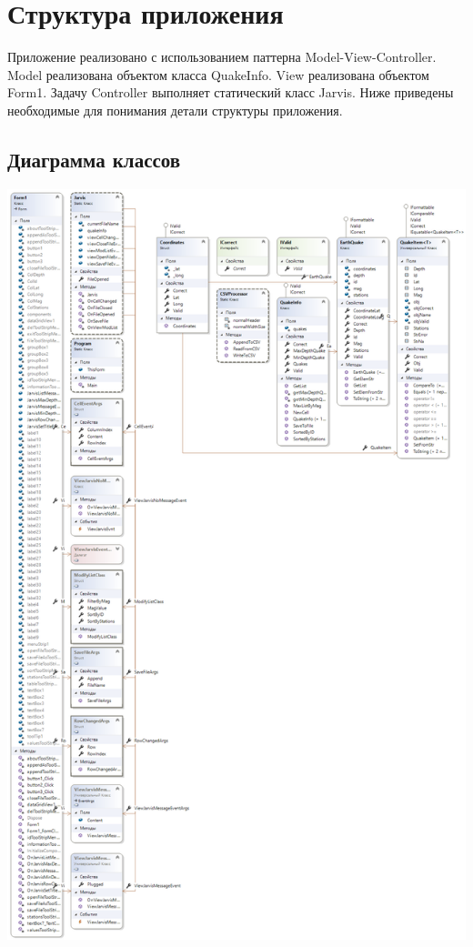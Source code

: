 \documentclass[a4paper,12pt, fleqn]{article}
\theoremstyle{plain} %
\theoremstyle{definition} %
\theoremstyle{remark} %
\numberwithin{equation}{section}
\begin{document}
\section{Структура приложения}
Приложение реализовано с использованием паттерна Model-View-Controller. Model реализована объектом класса QuakeInfo. View реализована объектом Form1. Задачу Controller выполняет статический класс Jarvis. Ниже приведены необходимые для понимания детали структуры приложения.
\subsection{Диаграмма классов}
\newpage
\includegraphics[width=1\linewidth]{ClassDiagram4.png}
\end{document}
